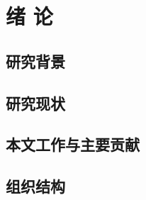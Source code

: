 \chapter{绪\hskip 0.4cm 论}
\label{chap1}

\section{研究背景}


\section{研究现状}



\section{本文工作与主要贡献}


\section{组织结构}




